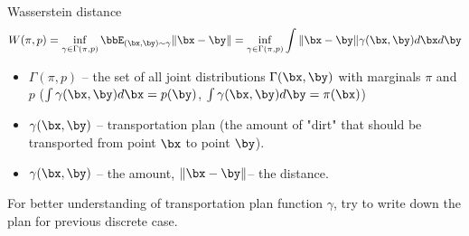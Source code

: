 \begin{frame}{Wasserstein distance}
	\[
		W(\pi, p) = \inf_{\gamma \in \Gamma(\pi, p)} \bbE_{(\bx, \by) \sim \gamma} \| \bx - \by \| =  \inf_{\gamma \in \Gamma(\pi, p)} \int \| \bx - \by \| \gamma (\bx, \by) d \bx d \by
	\]
	\begin{itemize}
		\item $\Gamma(\pi, p)$ -- the set of all joint distributions $\Gamma (\bx, \by)$ with marginals $\pi$ and $p$ ($\int \gamma(\bx, \by) d \bx = p(\by)$, $\int \gamma(\bx, \by) d \by = \pi(\bx)$)
		\item $\gamma(\bx, \by)$ -- transportation plan (the amount of "dirt" that should be transported from point $\bx$ to point $\by$).
		\item $\gamma(\bx, \by)$ -- the amount, $\|\bx - \by \|$-- the distance.
	\end{itemize}
	For better understanding of transportation plan function $\gamma$, try to write down the plan for previous discrete case.
\end{frame}
